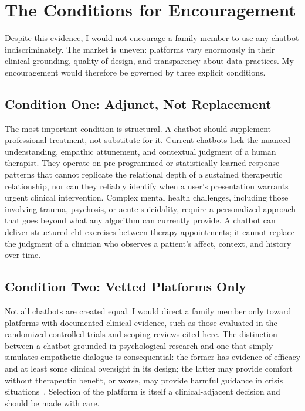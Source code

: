 \documentclass[11pt,showkeys]{essay}
\begin{document}
\section{The Conditions for Encouragement}

Despite this evidence, I would not encourage a family member to use any chatbot indiscriminately. The market is uneven: platforms vary enormously in their clinical grounding, quality of design, and transparency about data practices. My encouragement would therefore be governed by three explicit conditions.

\subsection{Condition One: Adjunct, Not Replacement}

The most important condition is structural. A chatbot should supplement professional treatment, not substitute for it. Current chatbots lack the nuanced understanding, empathic attunement, and contextual judgment of a human therapist. They operate on pre-programmed or statistically learned response patterns that cannot replicate the relational depth of a sustained therapeutic relationship, nor can they reliably identify when a user's presentation warrants urgent clinical intervention. Complex mental health challenges, including those involving trauma, psychosis, or acute suicidality, require a personalized approach that goes beyond what any algorithm can currently provide. A chatbot can deliver structured \gls{cbt} exercises between therapy appointments; it cannot replace the judgment of a clinician who observes a patient's affect, context, and history over time.

\subsection{Condition Two: Vetted Platforms Only}

Not all chatbots are created equal. I would direct a family member only toward platforms with documented clinical evidence, such as those evaluated in the randomized controlled trials and scoping reviews cited here. The distinction between a chatbot grounded in psychological research and one that simply simulates empathetic dialogue is consequential: the former has evidence of efficacy and at least some clinical oversight in its design; the latter may provide comfort without therapeutic benefit, or worse, may provide harmful guidance in crisis situations~\cite{vanderschyff_robot_2023}. Selection of the platform is itself a clinical-adjacent decision and should be made with care.
\end{document}
